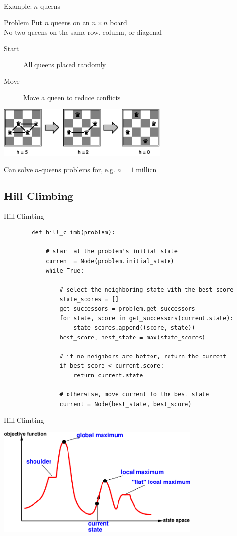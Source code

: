 \documentclass[12pt]{beamer}
\begin{document}
\begin{frame}{Example: $n$-queens}
	\begin{block}{Problem}
		Put $n$ queens on an $n \times n$ board \\
		No two queens	on the same row, column, or diagonal
	\end{block}
	\begin{description}
		\item[Start] All queens placed randomly
		\item[Move] Move a queen to reduce conflicts
	\end{description}
	\begin{center}
		\includegraphics[height=1in]{4-queens-iterative.pdf}
	\end{center}
	Can solve $n$-queens problems for, e.g. $n = 1$ million
\end{frame}

\subsection{Hill Climbing}
\begin{frame}[fragile]{Hill Climbing}
	\scriptsize
	\begin{lstlisting}
		def hill_climb(problem):
		
		    # start at the problem's initial state
		    current = Node(problem.initial_state)
		    while True:
		
		        # select the neighboring state with the best score
		        state_scores = []
		        get_successors = problem.get_successors
		        for state, score in get_successors(current.state):
		            state_scores.append((score, state))
		        best_score, best_state = max(state_scores)
		
		        # if no neighbors are better, return the current
		        if best_score < current.score:
		            return current.state
		
		        # otherwise, move current to the best state
		        current = Node(best_state, best_score)
	\end{lstlisting}
\end{frame}
\begin{frame}{Hill Climbing}
	\begin{center}
		\includegraphics[width=4in]{hill-climbing.pdf}
	\end{center}
\end{frame}
\end{document}
